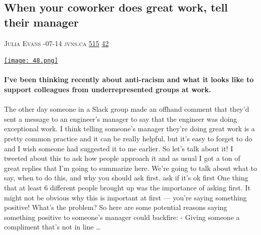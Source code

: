 \documentclass[10pt,a4paper]{article}
\begin{document}
\begin{multicols}{2}
\raggedcolumns
\noindent\begin{minipage}{\linewidth}
\medskip
\subsection{When your coworker does great work, tell their manager}
\textsc{\footnotesize
{\scriptsize\faUser}\space 
Julia Evans 
{\scriptsize\faCalendar}-07-14 
{\scriptsize\faGlobe}\space 
jvns.ca 
{\scriptsize\faThumbsOUp}\space 
\href{http://news.ycombinator.com/item?id=37340010\&utm\_term=comment}{515} 
{\scriptsize\faComments}\space 
\href{http://news.ycombinator.com/item?id=37340010\&utm\_term=comment}{42} 
}
\par\medskip\noindent
\href{https://jvns.ca/blog/2020/07/14/when-your-coworker-does-great-work-tell-their-manager/?utm\_source=hackernewsletter\&utm\_medium=email\&utm\_term=working}{
    \texttt{[image: 48.png]}
}
\end{minipage}
\paragraph{}
\textbf{I’ve been thinking recently about anti-racism and what it looks like to support colleagues from underrepresented groups at work.}
\paragraph{}
 The other day someone in a Slack group made an offhand comment that they’d sent a message to an engineer’s manager to say that the engineer was doing exceptional work.
I think telling someone’s manager they’re doing great work is a pretty common practice and it can be really helpful, but it’s easy to forget to do and I wish someone had suggested it to me earlier. So let’s talk about it!
I tweeted about this to ask how people approach it and as usual I got a ton of great replies that I’m going to summarize here.
We’re going to talk about what to say, when to do this, and why you should ask first.
ask if it’s ok first
One thing that at least 6 different people brought up was the importance of asking first. It might not be obvious why this is important at first — you’re saying something positive! What’s the problem?
So here are some potential reasons saying something positive to someone’s manager could backfire:
- Giving someone a compliment that’s not in line
\dots\par
\noindent\begin{minipage}{\linewidth}
\medskip

\end{minipage}
\end{multicols}
\end{document}
